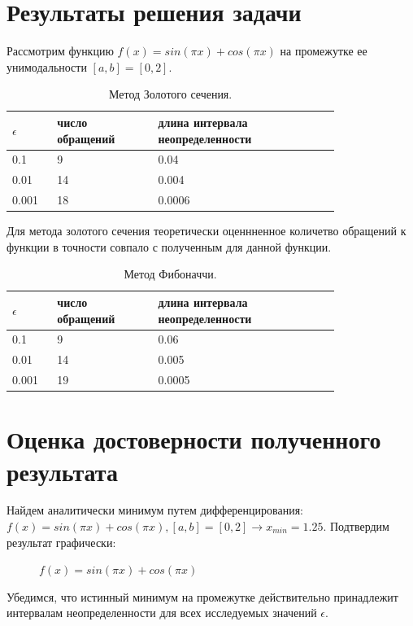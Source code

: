 \documentclass[main.tex]{subfiles}
\begin{document}
	\section{Результаты решения задачи}
	Рассмотрим функцию \newline$f(x) = sin(\pi x) + cos(\pi x)$ на промежутке ее унимодальности $[a, b] = [0, 2].$\\
	
	\begin{table}[h]
		\begin{tabular} { | p{0.1\linewidth} | p{0.25\linewidth} | p{0.45\linewidth} |}
			\hline
			$\epsilon$ & число обращений & длина интервала неопределенности  \\ \hline
			0.1 & 9 & 0.04  \\ \hline
			0.01 & 14 & 0.004  \\ \hline
			0.001 & 18 & 0.0006   \\ \hline
		\end{tabular}
		\caption{Метод Золотого сечения.}
	\end{table}
	Для метода золотого сечения теоретически оценнненное количетво обращений к функции в точности совпало с полученным для данной функции.
	
	\begin{table}[h]
		\begin{tabular} { | p{0.1\linewidth} | p{0.25\linewidth} | p{0.45\linewidth} |}
			\hline
			$\epsilon$ & число обращений & длина интервала неопределенности  \\ \hline
			0.1 & 9 & 0.06  \\ \hline
			0.01 & 14 & 0.005 \\ \hline
			0.001 & 19 &  0.0005  \\ \hline
		\end{tabular}
		\caption{Метод Фибоначчи.}
	\end{table}
	
	
	\section{Оценка достоверности полученного результата}
	Найдем аналитически минимум путем дифференцирования:
	$f(x) = sin(\pi x) + cos(\pi x), [a, b] = [0, 2] \rightarrow x_{min} = 1.25.$
	Подтвердим результат графически:
	\begin{figure}[H]
		\caption{$f(x) = sin(\pi x) + cos(\pi x)$}
		\label{function2}
	\end{figure}
	Убедимся, что истинный минимум на промежутке действительно принадлежит интервалам неопределенности для всех исследуемых значений $\epsilon$.\\
	
\end{document}
